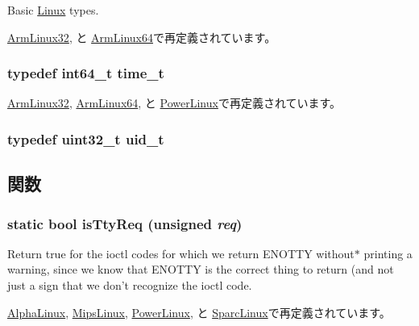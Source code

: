 Basic \hyperlink{classLinux}{Linux} types. 

\hyperlink{classArmLinux32_a29d85914ddff32967d85ada69854206d}{ArmLinux32}, と \hyperlink{classArmLinux64_a186ea1339bffb378854987065835afe3}{ArmLinux64}で再定義されています。\hypertarget{classLinux_a7f5991675a84025dc7c24754a9b257c0}{
\subsubsection[{time\_\-t}]{\setlength{\rightskip}{0pt plus 5cm}typedef int64\_\-t {\bf time\_\-t}}}
\label{classLinux_a7f5991675a84025dc7c24754a9b257c0}


\hyperlink{classArmLinux32_a9c837e14046ebcf4099bb559bd6637ca}{ArmLinux32}, \hyperlink{classArmLinux64_a7f5991675a84025dc7c24754a9b257c0}{ArmLinux64}, と \hyperlink{classPowerLinux_a9c837e14046ebcf4099bb559bd6637ca}{PowerLinux}で再定義されています。\hypertarget{classLinux_af2306308627701b66dc6f3babe821ab4}{
\subsubsection[{uid\_\-t}]{\setlength{\rightskip}{0pt plus 5cm}typedef {\bf uint32\_\-t} {\bf uid\_\-t}}}
\label{classLinux_af2306308627701b66dc6f3babe821ab4}


\subsection{関数}
\hypertarget{classLinux_ab20bdd4422ecf6e1736a5587be296b3f}{
\subsubsection[{isTtyReq}]{\setlength{\rightskip}{0pt plus 5cm}static bool isTtyReq (unsigned {\em req})}}
\label{classLinux_ab20bdd4422ecf6e1736a5587be296b3f}
Return true for the ioctl codes for which we return ENOTTY without$\ast$ printing a warning, since we know that ENOTTY is the correct thing to return (and not just a sign that we don't recognize the ioctl code. 

\hyperlink{classAlphaLinux_ab20bdd4422ecf6e1736a5587be296b3f}{AlphaLinux}, \hyperlink{classMipsLinux_ab20bdd4422ecf6e1736a5587be296b3f}{MipsLinux}, \hyperlink{classPowerLinux_ab20bdd4422ecf6e1736a5587be296b3f}{PowerLinux}, と \hyperlink{classSparcLinux_ab20bdd4422ecf6e1736a5587be296b3f}{SparcLinux}で再定義されています。


